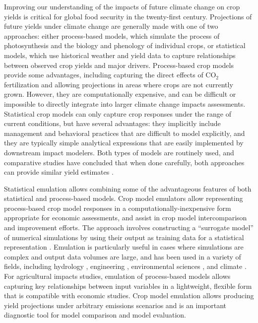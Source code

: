 \documentclass[gmd, manuscript]{copernicus} %
\begin{document}
\introduction
\label{S:1}
Improving our understanding of the impacts of future climate change on crop yields is critical for global food security in the twenty-first century. 
Projections of future yields under climate change are generally made with one of two approaches: either process-based models, which  simulate the process of photosynthesis and the biology and phenology of individual crops, or statistical models, which use historical weather and yield data to capture relationships between observed crop yields and major drivers.
Process-based crop models provide some advantages, including capturing the direct effects of CO$_2$ fertilization and allowing projections in areas where crops are not currently grown. 
However, they are computationally expensive, and can be difficult or impossible to directly integrate into larger climate change impacts assessments.
Statistical crop models can only capture crop responses under the range of current conditions, but have several advantages: they implicitly include management and behavioral practices that are difficult to model explicitly, and they are typically simple analytical expressions that are easily implemented by downstream impact modelers. 
Both types of models are routinely used, and comparative studies have concluded that when done carefully, both approaches can provide similar yield estimates \citep[e.g.][]{Lobell2010, Moore2017, Roberts2017, zhao2017,liu2016similar}. 

Statistical emulation allows combining some of the advantageous features of both statistical and process-based models.
Crop model emulators allow representing process-based crop model responses in a computationally-inexpensive form appropriate for economic assessments, and assist in crop model intercomparison and improvement efforts.
The approach involves constructing a ``surrogate model'' of numerical simulations by using their output as training data for a statistical representation \citep[e.g.][]{OHAGAN2006, OHAGAN2010}. 
Emulation is particularly useful in cases where simulations are complex and output data volumes are large, and has been used in a variety of fields, including hydrology \citep[e.g.][]{Razavi2012}, engineering \citep[e.g.][]{STORLIE2009}, environmental sciences \citep[e.g.][]{RATTO2012}, and climate \citep[e.g.][]{Castruccio14, Holden2014}. 
For agricultural impacts studies, emulation of process-based models allows capturing key relationships between input variables in a lightweight, flexible form that is compatible with economic studies. 
Crop model emulation allows producing yield projections under arbitrary emissions scenarios and is an important diagnostic tool for model comparison and model evaluation.
\end{document}
